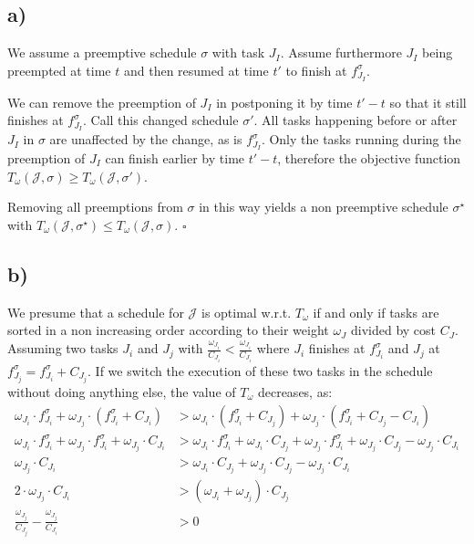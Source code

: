 \documentclass[12pt]{article}
\begin{document}
\subsection*{a)}
We assume a preemptive schedule $\sigma$ with task $J_I$. Assume furthermore $J_I$ being preempted at time $t$ and then resumed at time $t'$ to finish at $f^\sigma_{J_I}$. 

We can remove the preemption of $J_I$ in postponing it by time $t' - t$ so that it still finishes at $f^\sigma_{J_I}$. Call this changed schedule $\sigma'$. All tasks happening before or after $J_I$ in $\sigma$ are unaffected by the change, as is $f^\sigma_{J_I}$. 
Only the tasks running during the preemption of $J_I$ can finish earlier by time $t' - t$, therefore the objective function $T_\omega (\mathcal{J}, \sigma) \geq T_\omega (\mathcal{J}, \sigma')$. 

Removing all preemptions from $\sigma$ in this way yields a non preemptive schedule $\sigma^\star$ with $T_\omega (\mathcal{J}, \sigma^\star) \leq T_\omega (\mathcal{J}, \sigma)$. $\square$

\subsection*{b)}
We presume that a schedule for $\mathcal{J}$ is optimal w.r.t. $T_\omega$ if and only if tasks are sorted in a non increasing order according to their weight $\omega_J$ divided by cost $C_J$.
Assuming two tasks $J_i$ and $J_j$ with $\frac{\omega_{J_i}}{C_{J_i}} < \frac{\omega_{J_i}}{C_{J_i}}$ where $J_i$ finishes at $f^\sigma_{J_i}$ and $J_j$ at $f^\sigma_{J_j} = f^\sigma_{J_i} + C_{J_j}$.
If we switch the execution of these two tasks in the schedule without doing anything else, the value of $T_\omega$ decreases, as:
\begin{align*}
\omega_{J_i} \cdot f^\sigma_{J_i} + \omega_{J_j} \cdot (f^\sigma_{J_i} + C_{J_i}) &> \omega_{J_i} \cdot (f^\sigma_{J_i} + C_{J_j}) + \omega_{J_j} \cdot (f^\sigma_{J_i} + C_{J_j} - C_{J_i} ) \\
\omega_{J_i} \cdot f^\sigma_{J_i} + \omega_{J_j} \cdot f^\sigma_{J_i} + \omega_{J_j} \cdot C_{J_i} &> \omega_{J_i} \cdot f^\sigma_{J_i} + \omega_{J_i} \cdot C_{J_j} + \omega_{J_j} \cdot f^\sigma_{J_i} + \omega_{J_j} \cdot C_{J_j} - \omega_{J_j} \cdot C_{J_i} \\
\omega_{J_j} \cdot C_{J_i} &> \omega_{J_i} \cdot C_{J_j} + \omega_{J_j} \cdot C_{J_j} - \omega_{J_j} \cdot C_{J_i} \\
2 \cdot \omega_{J_j} \cdot C_{J_i} &> ( \omega_{J_i} +  \omega_{J_j} ) \cdot C_{J_j} \\
\frac{\omega_{J_j}}{C_{J_j}} - \frac{\omega_{J_j}}{C_{J_i}} &> 0 \\
\end{align*}
\end{document}
